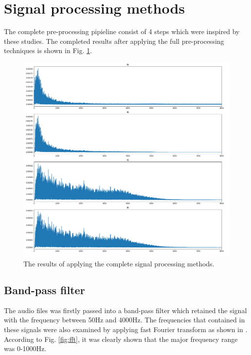 \section{Signal processing methods}
The complete pre-processing pipieline consist of 4 steps which were inspired by these studies.\cite{Lei2014Content-basedFeatures}\cite{Niu2019AState}\cite{Ren2015Fine-grainedSmartphones} The completed results after applying the full pre-processing techniques is shown in Fig. \ref{fig:fft_pipeline}.
\begin{figure}[h]
    \centerline{\includegraphics[scale=0.33]{figures/fft_pipeline.png}}
    \caption{The results of applying the complete signal processing methods.}
    \label{fig:fft_pipeline}
\end{figure}

\subsection{Band-pass filter}
The audio files was firstly passed into a band-pass filter which retained the signal with the frequency between 50Hz and 4000Hz. The frequencies that contained in these signals were also examined by applying fast Fourier transform as shown in . According to Fig. \ref{fig:fft}, it was clearly shown that the major frequency range was 0-1000Hz.

